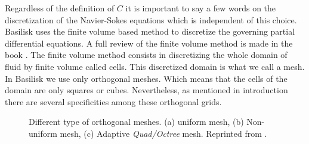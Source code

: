 Regardless of the definition of $C$ it is important to say a few words on the discretization of the Navier-Sokes equations which is independent of this choice. 
Basilisk uses the finite volume based method to discretize the governing partial differential equations.
A full review of the finite volume method is made in the book \citet{ferziger2002computational}.
The finite volume method consists in discretizing the whole domain of fluid by finite volume called cells. 
This discretized domain is what we call a mesh. 
In Basilisk we use only orthogonal meshes. 
Which means that the cells of the domain are only squares or cubes.
Nevertheless, as mentioned in introduction there are several specificities among these orthogonal grids.   
\begin{figure}[h!]
    \centering
    \caption{Different type of orthogonal meshes. (a) uniform mesh, (b) Non-uniform mesh, (c) Adaptive \textit{Quad/Octree} mesh. Reprinted from \citet{mani2021numerical}. }
    \label{fig:meshes}
\end{figure}
